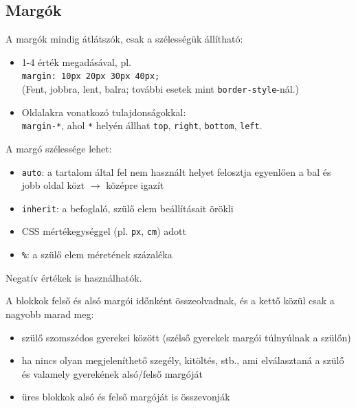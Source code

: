\subsection{Margók}

\begin{frame}
  A margók mindig átlátszók, csak a szélességük állítható:
  \begin{itemize}
    \item 1-4 érték megadásával, pl.\\
    \texttt{margin: 10px 20px 30px 40px;}\\
    (Fent, jobbra, lent, balra; további esetek mint \texttt{border-style}-nál.)
    \item Oldalakra vonatkozó tulajdonságokkal:\\
      \texttt{margin-*}, ahol \texttt{*} helyén állhat 
      \texttt{top}, \texttt{right}, \texttt{bottom}, \texttt{left}.
  \end{itemize}
\end{frame}

\begin{frame}
  A margó szélessége lehet:
  \begin{itemize}
    \item \texttt{auto}: a tartalom által fel nem használt helyet felosztja egyenlően a bal és jobb oldal közt $\to$ középre igazít
    \item \texttt{inherit}: a befoglaló, szülő elem beállításait örökli
    \item CSS mértékegységgel (pl. \texttt{px}, \texttt{cm}) adott
    \item \texttt{\%}: a szülő elem méretének százaléka
  \end{itemize}
  \vfill
  Negatív értékek is használhatók.
\end{frame}

\begin{frame}
  A blokkok felső és alsó margói időnként összeolvadnak, és a kettő közül csak a nagyobb marad meg:
  \begin{itemize}
    \item szülő szomszédos gyerekei között (szélső gyerekek 
    margói túlnyúlnak a szülőn)
    \item ha nincs olyan megjeleníthető szegély, kitöltés, stb., 
    ami elválasztaná a szülő és valamely gyerekének alsó/felső margóját
    \item üres blokkok alsó és felső margóját is összevonják
  \end{itemize}
  \vfill
\end{frame}

